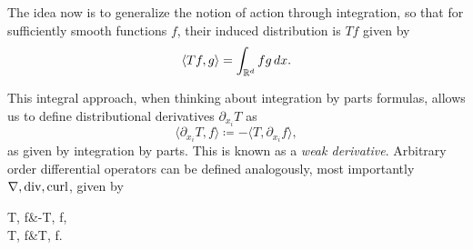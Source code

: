The idea now is to generalize the notion of action through integration, so that for sufficiently smooth functions $f$, their induced distribution is $Tf$ given by
\begin{equation}\label{eq:action-distribution}
    \langle Tf, g \rangle = \int_{\mathbb{R}^d} fg\,dx.
\end{equation}

This integral approach, when thinking about integration by parts formulas, allows us to define distributional derivatives $\partial_{x_i} T$ as
\begin{equation}\label{eq:distributional-ibp}
    \langle \partial_{x_i} T, f\rangle \coloneqq -\langle T, \partial_{x_i} f\rangle,
\end{equation}
as given by integration by parts. This is known as a \emph{weak derivative}. Arbitrary order differential operators can be defined analogously, most importantly $\operatorname{\nabla}, \operatorname{\text{div}}, \operatorname{\text{curl}}$, given by 
\begin{tightalign}
    \langle \dive T, f\rangle &\coloneqq -\langle T, \grad f\rangle, \\
    \langle \curl T, f\rangle &\coloneqq \langle T, \curl f\rangle.
\end{tightalign}
